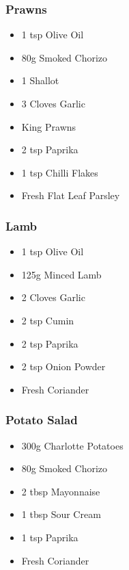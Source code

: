 \documentclass[11pt, english]{article}
\begin{document}
		\subsubsection*{Prawns}

	\begin{itemize}
        \setlength\itemsep{0cm}
                \item 1 tsp Olive Oil
		\item 80g Smoked Chorizo
		\item 1 Shallot
		\item 3 Cloves Garlic
		\item King Prawns
		\item 2 tsp Paprika
		\item 1 tsp Chilli Flakes
		\item Fresh Flat Leaf Parsley
        \end{itemize}

		\subsubsection*{Lamb}

	\begin{itemize}
        \setlength\itemsep{0cm}
                \item 1 tsp Olive Oil
		\item 125g Minced Lamb
		\item 2 Cloves Garlic
		\item 2 tsp Cumin
		\item 2 tsp Paprika
		\item 2 tsp Onion Powder
		\item Fresh Coriander
        \end{itemize}

		\subsubsection*{Potato Salad}

	\begin{itemize}
        \setlength\itemsep{0cm}
                \item 300g Charlotte Potatoes
		\item 80g Smoked Chorizo
		\item 2 tbsp Mayonnaise
		\item 1 tbsp Sour Cream
		\item 1 tsp Paprika
		\item Fresh Coriander
        \end{itemize}
\end{document}
